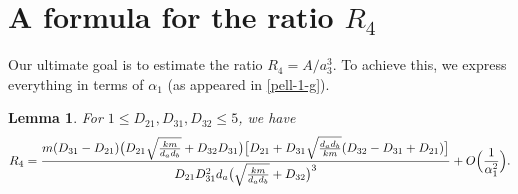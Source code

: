 \documentclass[12pt]{article}
\newtheorem{lem}{Lemma}
\begin{document}
\section{A formula for the ratio $R_4$}

Our ultimate goal is to estimate the ratio $R_4 = A / a_3^3$. To achieve this, we express everything in terms of $\alpha_1$ (as appeared in \eqref{pell-1-g}).
\begin{lem} \label{lem14}
For $1 \le D_{21}, D_{31}, D_{32} \le 5$, we have
\begin{equation*}
    R_4 = \frac{m (D_{31}-D_{21}) \bigl( D_{21}\sqrt{\frac{k m}{d_a d_b}}+D_{32}{D_{31} \bigr)\bigl[ D_{21} + D_{31}\sqrt{\frac{d_a d_b}{k m}}(D_{32}-D_{31}+D_{21})}\bigr]}
    {D_{21}D_{31}^2 d_a\bigl( \sqrt{\frac{k m}{d_a d_b}}+D_{32} \bigr)^3} + O\Bigl(\frac{1}{\alpha_1^2}\Bigr).
\end{equation*}
\end{lem}
\end{document}
